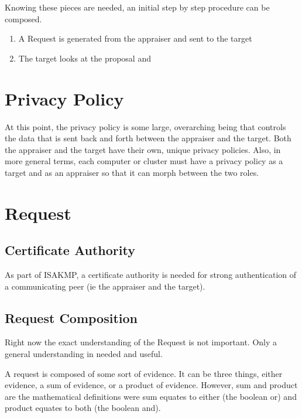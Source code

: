 \documentclass[10pt]{article}
\begin{document}
\begin{itemize}
\end{itemize}

Knowing these pieces are needed, an initial step by step procedure can be composed.
\begin{enumerate}
\item A Request is generated from the appraiser and sent to the target
	\begin{itemize}
	
	\end{itemize}
\item The target looks at the proposal and 
\end{enumerate} 

\section {Privacy Policy}

At this point, the privacy policy is some large, overarching being that controls the data that is sent back and forth between the appraiser and the target. Both the appraiser and the target have their own, unique privacy policies. Also, in more general terms, each computer or cluster must have a privacy policy as a target and as an appraiser so that it can morph between the two roles. 

\section {Request}

\subsection {Certificate Authority}
  
  As part of ISAKMP, a certificate authority is needed for strong 
  authentication of a communicating peer (ie the appraiser and the
  target). 

\subsection {Request Composition}
  
  Right now the exact understanding of the Request is not important.
  Only a general understanding in needed and useful. 
  
  A request is composed of some sort of evidence. It can be three things, either evidence, a sum of evidence, or a product of evidence. However, sum and product are the mathematical definitions were sum equates to either (the boolean or) and product equates to both (the boolean and). 
  
\end{document}

